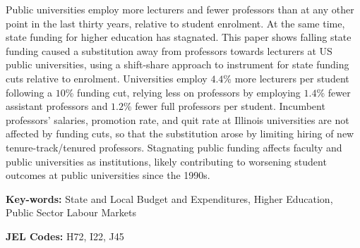 Public universities employ more lecturers and fewer professors than at any other point in the last thirty years, relative to student enrolment.
At the same time, state funding for higher education has stagnated.
This paper shows falling state funding caused a substitution away from professors towards lecturers at US public universities, using a shift-share approach to instrument for state funding cuts relative to enrolment.
Universities employ $4.4$\% more lecturers per student following a $10$\% funding cut, relying less on professors by employing $1.4$\% fewer assistant professors and $1.2$\% fewer full professors per student.
Incumbent professors' salaries, promotion rate, and quit rate at Illinois universities are not affected by funding cuts, so that the substitution arose by limiting hiring of new tenure-track/tenured professors.
Stagnating public funding affects faculty and public universities as institutions, likely contributing to worsening student outcomes at public universities since the 1990s.

\vfill
\noindent
\textbf{Key-words:}
State and Local Budget and Expenditures,
Higher Education,
Public Sector Labour Markets

\vspace{0.05cm}
\noindent
\textbf{JEL Codes:} H72, I22, J45
